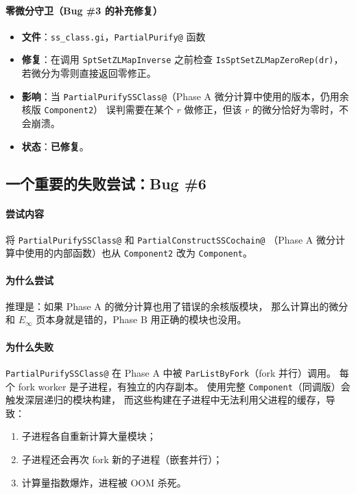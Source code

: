 \documentclass[a4paper,fontset=ubuntu,12pt]{ctexart}
\begin{document}
\paragraph{零微分守卫（Bug \#3 的补充修复）}
\begin{itemize}
\item \textbf{文件}：\texttt{ss\_class.gi}，\texttt{PartialPurify@} 函数
\item \textbf{修复}：在调用 \texttt{SptSetZLMapInverse} 之前检查 \texttt{IsSptSetZLMapZeroRep(dr)}，
  若微分为零则直接返回零修正。
\item \textbf{影响}：当 \texttt{PartialPurifySSClass@}（Phase A 微分计算中使用的版本，仍用余核版 \texttt{Component2}）
  误判需要在某个 $r$ 做修正，但该 $r$ 的微分恰好为零时，不会崩溃。
\item \textbf{状态}：\textbf{已修复}。
\end{itemize}

\subsection{一个重要的失败尝试：Bug \#6}
\label{sec:bug6-failure}

\paragraph{尝试内容}
将 \texttt{PartialPurifySSClass@} 和 \texttt{PartialConstructSSCochain@}
（Phase A 微分计算中使用的内部函数）也从 \texttt{Component2} 改为 \texttt{Component}。

\paragraph{为什么尝试}
推理是：如果 Phase A 的微分计算也用了错误的余核版模块，
那么计算出的微分和 $E_\infty$ 页本身就是错的，Phase B 用正确的模块也没用。

\paragraph{为什么失败}
\texttt{PartialPurifySSClass@} 在 Phase A 中被 \texttt{ParListByFork}（fork 并行）调用。
每个 fork worker 是子进程，有独立的内存副本。
使用完整 \texttt{Component}（同调版）会触发深层递归的模块构建，
而这些构建在子进程中无法利用父进程的缓存，导致：
\begin{enumerate}
\item 子进程各自重新计算大量模块；
\item 子进程还会再次 fork 新的子进程（嵌套并行）；
\item 计算量指数爆炸，进程被 OOM 杀死。
\end{enumerate}
\end{document}
